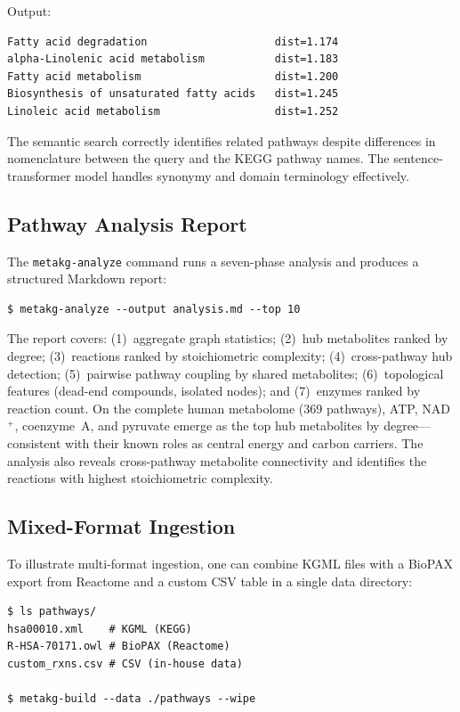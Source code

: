 \documentclass[10pt]{article}
\begin{document}
Output:
\begin{lstlisting}[style=bash, caption={}]
Fatty acid degradation                    dist=1.174
alpha-Linolenic acid metabolism           dist=1.183
Fatty acid metabolism                     dist=1.200
Biosynthesis of unsaturated fatty acids   dist=1.245
Linoleic acid metabolism                  dist=1.252
\end{lstlisting}

The semantic search correctly identifies related pathways despite differences
in nomenclature between the query and the KEGG pathway names. The
sentence-transformer model handles synonymy and domain terminology effectively.

\subsection{Pathway Analysis Report}

The \texttt{metakg-analyze} command runs a seven-phase analysis and produces a
structured Markdown report:

\begin{lstlisting}[style=bash]
$ metakg-analyze --output analysis.md --top 10
\end{lstlisting}

The report covers: (1)~aggregate graph statistics; (2)~hub metabolites ranked
by degree; (3)~reactions ranked by stoichiometric complexity;
(4)~cross-pathway hub detection; (5)~pairwise pathway coupling by shared
metabolites; (6)~topological features (dead-end compounds, isolated nodes);
and (7)~enzymes ranked by reaction count. On the complete human metabolome
(369 pathways), ATP, NAD$^{+}$, coenzyme~A, and pyruvate emerge as the top
hub metabolites by degree---consistent with their known roles as central
energy and carbon carriers. The analysis also reveals cross-pathway metabolite
connectivity and identifies the reactions with highest stoichiometric
complexity.

\subsection{Mixed-Format Ingestion}

To illustrate multi-format ingestion, one can combine KGML files with a
BioPAX export from Reactome and a custom CSV table in a single data directory:

\begin{lstlisting}[style=bash]
$ ls pathways/
hsa00010.xml    # KGML (KEGG)
R-HSA-70171.owl # BioPAX (Reactome)
custom_rxns.csv # CSV (in-house data)

$ metakg-build --data ./pathways --wipe
\end{lstlisting}
\end{document}
